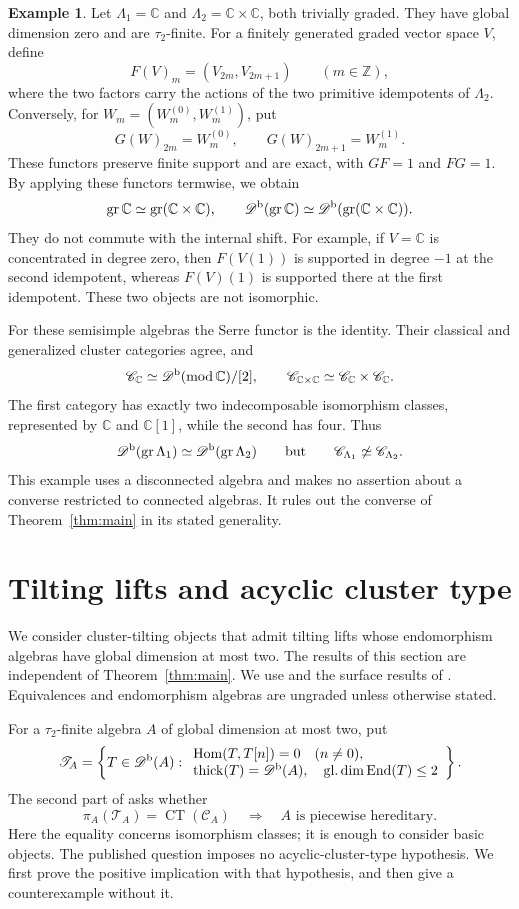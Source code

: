 \documentclass[12pt,a4paper,english,reqno]{amsart}
\theoremstyle{plain}
\theoremstyle{definition}
\newtheorem{exm}[thm]{Example}
\numberwithin{equation}{section}
\newcommand{\thmref}[1]{Theorem~\ref{#1}}
\def\ta{\tau}
\def\La{\Lambda}
\def\Hom{\operatorname{Hom}}
\def\End{\operatorname{End}}
\def\thick{\operatorname{thick}}
\def\Db{{\mathcal D}^{\text{\rm b}}}
\def\calC{{\mathcal C}}
\def\bbZ{{\mathbb Z}}
\def\bbC{{\mathbb C}}
\def\gr{\operatorname{gr}}
\newcommand{\CT}{\operatorname{CT}}
\begin{document}
\begin{exm}\label{ex:no-converse}
Let $\La_1=\bbC$ and $\La_2=\bbC\times\bbC$, both trivially graded. They have global dimension zero and are $\ta_2$-finite. For a finitely generated graded vector space $V$, define
\[
 F(V)_m=(V_{2m},V_{2m+1})\qquad(m\in\bbZ),
\]
where the two factors carry the actions of the two primitive idempotents of $\La_2$. Conversely, for $W_m=(W_m^{(0)},W_m^{(1)})$, put
\[
 G(W)_{2m}=W_m^{(0)},\qquad
 G(W)_{2m+1}=W_m^{(1)}.
\]
These functors preserve finite support and are exact, with $GF=1$ and $FG=1$. By applying these functors termwise, we obtain
\[
 \gr\bbC\simeq\gr(\bbC\times\bbC),\qquad
 \Db(\gr\bbC)\simeq\Db(\gr(\bbC\times\bbC)).
\]
They do not commute with the internal shift. For example, if $V=\bbC$ is concentrated in degree zero, then $F(V(1))$ is supported in degree $-1$ at the second idempotent, whereas $F(V)(1)$ is supported there at the first idempotent. These two objects are not isomorphic.

For these semisimple algebras the Serre functor is the identity. Their classical and generalized cluster categories agree, and
\[
 \calC_{\bbC}\simeq\Db(\operatorname{mod}\bbC)/[2],
 \qquad
 \calC_{\bbC\times\bbC}\simeq\calC_{\bbC}\times\calC_{\bbC}.
\]
The first category has exactly two indecomposable isomorphism classes, represented by $\bbC$ and $\bbC[1]$, while the second has four. Thus
\[
 \Db(\gr\La_1)\simeq\Db(\gr\La_2)
 \qquad\text{but}\qquad
 \calC_{\La_1}\not\simeq\calC_{\La_2}.
\]
This example uses a disconnected algebra and makes no assertion about a converse restricted to connected algebras. It rules out the converse of \thmref{thm:main} in its stated generality.
\end{exm}

\section{Tilting lifts and acyclic cluster type}\label{sec:torus-lifting}
We consider cluster-tilting objects that admit tilting lifts whose endomorphism algebras have global dimension at most two. The results of this section are independent of \thmref{thm:main}. We use \cite[Theorem~3.5]{AO} and the surface results of \cite{AGSurface,AmiotTorus,BZ}. Equivalences and endomorphism algebras are ungraded unless otherwise stated.

For a $\ta_2$-finite algebra $A$ of global dimension at most two, put
\[
 \mathcal T_A=\left\{T\in\Db(A):
 \begin{array}{l}
 \Hom(T,T[n])=0\quad(n\ne0),\\
 \thick(T)=\Db(A),\quad \operatorname{gl.dim}\End(T)\le2
 \end{array}\right\}.
\]
The second part of \cite[Question 6.23, p.~47]{AOTree} asks whether
\[
 \pi_A(\mathcal T_A)=\CT(\calC_A)
 \quad\Longrightarrow\quad A\text{ is piecewise hereditary}.
\]
Here the equality concerns isomorphism classes; it is enough to consider basic objects. The published question imposes no acyclic-cluster-type hypothesis. We first prove the positive implication with that hypothesis, and then give a counterexample without it.
\end{document}
